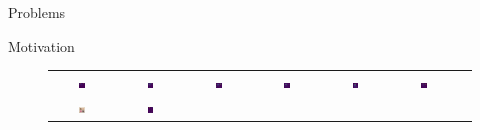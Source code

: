 \documentclass[aspectratio=169]{beamer}
\begin{document}
\begin{section}{Problems}
\begin{subsection}{Motivation}
\begin{frame}
\begin{figure}[h]
{\begin{tabular}{c cc cc cc }
      \includegraphics[width=0.10\textwidth]{resources/230914_1202_fig2_vizs_various_models/deit3_base_patch16_224.fb_in22k_ft_in1k_85_lastattmap.png} &
      \includegraphics[width=0.10\textwidth]{resources/230914_1202_fig2_vizs_various_models/deit3_large_patch16_224.fb_in22k_ft_in1k_85_lastattmap.png} &
      \includegraphics[width=0.10\textwidth]{resources/230914_1202_fig2_vizs_various_models/vit_base_patch16_clip_224.laion2b_85_lastattmap.png} &
      \includegraphics[width=0.10\textwidth]{resources/230914_1202_fig2_vizs_various_models/vit_large_patch14_clip_224.laion2b_85_lastattmap.png} &
      \includegraphics[width=0.10\textwidth]{resources/230914_1202_fig2_vizs_various_models/vit_base_patch16_224.dino_85_lastattmap.png} &
      \includegraphics[width=0.10\textwidth]{resources/230914_1202_fig2_vizs_various_models/vit_giant_patch14_dinov2.lvd142m_85_lastattmap.png}
      \\
      \includegraphics[width=0.10\textwidth]{resources/230914_1202_fig2_vizs_various_models/1753_orig.png} &
      \includegraphics[width=0.10\textwidth]{resources/230914_1202_fig2_vizs_various_models/deit3_base_patch16_224.fb_in22k_ft_in1k_1753_lastattmap.png} &

\end{tabular}}
\end{figure}
\end{frame}
\end{subsection}
\end{section}
\end{document}
